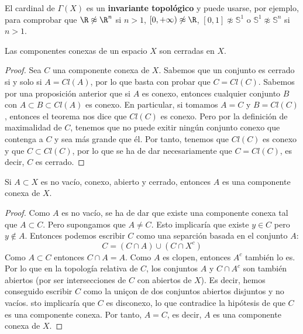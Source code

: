 \begin{observación}
    El cardinal de $\Gamma(X)$ es un \textbf{invariante topológico} y puede usarse, por ejemplo, para comprobar que $\R \not\approx \R^n$ si $n > 1$, $[0, +\infty) \not\approx \R$, $[0, 1] \not\approx \mathbb{S}^1$ o $\mathbb{S}^1 \not\approx \mathbb{S}^n$ si $n > 1$.
\end{observación}
\begin{proposición}
    Las componentes conexas de un espacio $X$ son cerradas en $X$.
\end{proposición}
\begin{proof}
    Sea $C$ una componente conexa de $X$. Sabemos que un conjunto es cerrado si y solo si $A = Cl(A)$, por lo que basta con probar que $C = Cl(C)$. Sabemos por una proposición anterior que si $A$ es conexo, entonces cualquier conjunto $B$ con $A \subset B \subset Cl(A)$ es conexo. 
    En particular, si tomamos $A = C$ y $B = Cl(C)$, entonces el teorema nos dice que $Cl(C)$ es conexo. Pero por la definición de maximalidad de $C$, tenemos que no puede exitir ningún conjunto conexo que contenga a $C$ y sea más grande que él. Por tanto, tenemos que $Cl(C)$ es conexo y que $C \subset Cl(C)$, por lo que se ha de dar necesariamente que $C = Cl(C)$, es decir, $C$ es cerrado.
\end{proof}
\begin{proposición}
    Si $A \subset X$ es no vacío, conexo, abierto y cerrado, entonces $A$ es una componente conexa de $X$.
\end{proposición}
\begin{proof}
    Como $A$ es no vacío, se ha de dar que existe una componente conexa tal que $A \subset C$. Pero supongamos que $A \neq C$. Esto implicaría que existe $y \in C$ pero $y \notin A$. Entonces podemos escribir $C$ como una separción basada en el conjunto $A$: 
    $$C = (C \cap A) \cup (C \cap X^{c})$$
    Como $A \subset C$ entonces $C \cap A = A$. Como $A$ es clopen, entonces $A^c$ también lo es. Por lo que en la topología relativa de $C$, los conjuntos $A$ y $C \cap A^c$ son también abiertos (por ser intersecciones de $C$ con abiertos de $X$). Es decir, hemos conseguido escribir $C$ como la uniçon de dos conjuntos abiertos disjuntos y no vacíos. sto implicaría que $C$ es disconexo, lo que contradice la hipótesis de que $C$ es una componente conexa. Por tanto, $A = C$, es decir, $A$ es una componente conexa de $X$.
\end{proof}

